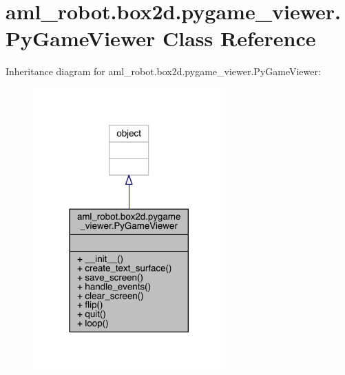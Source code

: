 \hypertarget{classaml__robot_1_1box2d_1_1pygame__viewer_1_1_py_game_viewer}{}\section{aml\+\_\+robot.\+box2d.\+pygame\+\_\+viewer.\+Py\+Game\+Viewer Class Reference}
\label{classaml__robot_1_1box2d_1_1pygame__viewer_1_1_py_game_viewer}


Inheritance diagram for aml\+\_\+robot.\+box2d.\+pygame\+\_\+viewer.\+Py\+Game\+Viewer\+:
\nopagebreak
\begin{figure}[H]
\begin{center}
\leavevmode
\includegraphics[width=209pt]{classaml__robot_1_1box2d_1_1pygame__viewer_1_1_py_game_viewer__inherit__graph}
\end{center}
\end{figure}


